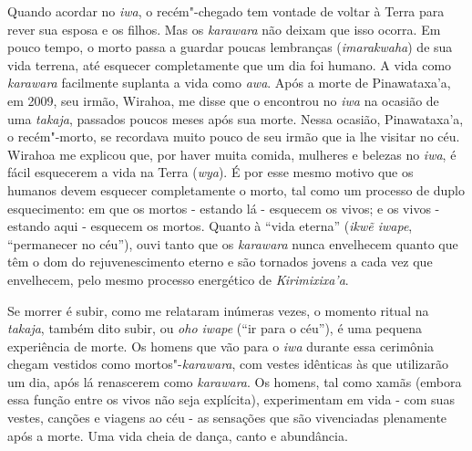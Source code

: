 Quando acordar no \emph{iwa}, o recém"-chegado tem vontade de voltar à
Terra para rever sua esposa e os filhos. Mas os \emph{karawara} não
deixam que isso ocorra. Em pouco tempo, o morto passa a guardar poucas
lembranças (\emph{imarakwaha}) de sua vida terrena, até esquecer
completamente que um dia foi humano. A vida como \emph{karawara}
facilmente suplanta a vida como \emph{awa}. Após a morte de
Pinawataxa'a, em 2009, seu irmão, Wirahoa, me disse que o encontrou no
\emph{iwa} na ocasião de uma \emph{takaja}, passados poucos meses após
sua morte. Nessa ocasião, Pinawataxa'a, o recém"-morto, se recordava
muito pouco de seu irmão que ia lhe visitar no céu. Wirahoa me explicou
que, por haver muita comida, mulheres e belezas no \emph{iwa}, é fácil
esquecerem a vida na Terra (\emph{wya}). É por esse mesmo motivo que os
humanos devem esquecer completamente o morto, tal como um processo de
duplo esquecimento: em que os mortos - estando lá - esquecem os vivos; e
os vivos - estando aqui - esquecem os mortos. Quanto à ``vida eterna''
(\emph{ikwẽ iwape}, ``permanecer no céu''), ouvi tanto que os
\emph{karawara} nunca envelhecem quanto que têm o dom do
rejuvenescimento eterno e são tornados jovens a cada vez que envelhecem,
pelo mesmo processo energético de \emph{Kirimixixa'a}.

Se morrer é subir, como me relataram inúmeras vezes, o momento ritual na
\emph{takaja}, também dito subir, ou \emph{oho iwape} (``ir para o céu''),
é uma pequena experiência de morte. Os homens que vão para o \emph{iwa}
durante essa cerimônia chegam vestidos como mortos"-\emph{karawara}, com
vestes idênticas às que utilizarão um dia, após lá renascerem como
\emph{karawara}. Os homens, tal como xamãs (embora essa função entre os
vivos não seja explícita), experimentam em vida - com suas vestes,
canções e viagens ao céu - as sensações que são vivenciadas plenamente
após a morte. Uma vida cheia de dança, canto e abundância.

